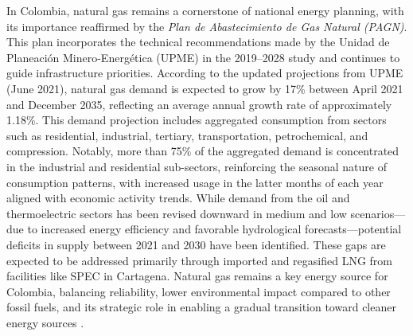 
In Colombia, natural gas remains a cornerstone of national energy planning, with its importance reaffirmed by the \textit{Plan de Abastecimiento de Gas Natural (PAGN)}. This plan incorporates the technical recommendations made by the Unidad de Planeación Minero-Energética (UPME) in the 2019–2028 study and continues to guide infrastructure priorities. According to the updated projections from UPME (June 2021), natural gas demand is expected to grow by 17\% between April 2021 and December 2035, reflecting an average annual growth rate of approximately 1.18\%. This demand projection includes aggregated consumption from sectors such as residential, industrial, tertiary, transportation, petrochemical, and compression. Notably, more than 75\% of the aggregated demand is concentrated in the industrial and residential sub-sectors, reinforcing the seasonal nature of consumption patterns, with increased usage in the latter months of each year aligned with economic activity trends. While demand from the oil and thermoelectric sectors has been revised downward in medium and low scenarios—due to increased energy efficiency and favorable hydrological forecasts—potential deficits in supply between 2021 and 2030 have been identified. These gaps are expected to be addressed primarily through imported and regasified LNG from facilities like SPEC in Cartagena. Natural gas remains a key energy source for Colombia, balancing reliability, lower environmental impact compared to other fossil fuels, and its strategic role in enabling a gradual transition toward cleaner energy sources \cite{Promigas_2021}.


